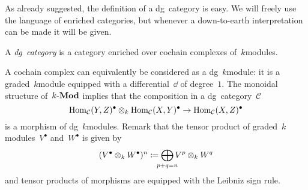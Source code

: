 As already suggested, the definition of a dg~category is easy. We will freely use the language of enriched categories, but whenever a down-to-earth interpretation can be made it will be given.
\begin{definition}
  \label{definition:dg-category-enriched}
  A \emph{dg~category} is a category enriched over cochain complexes of~$k$\dash modules.
\end{definition}
A cochain complex can equivalently be considered as a dg~$k$\dash module: it is a graded~$k$\dash module equipped with a differential~$\dd$ of degree~$1$. The monoidal structure of~$k\textrm{-}\mathbf{Mod}$ implies that the composition in a dg~category~$\mathcal{C}$
\begin{equation}
  \mathrm{Hom}_{\mathcal{C}}(Y,Z)^\bullet\otimes_k\mathrm{Hom}_{\mathcal{C}}(X,Y)^\bullet\to\mathrm{Hom}_{\mathcal{C}}(X,Z)^\bullet
\end{equation}
is a morphism of dg~$k$\dash modules. Remark that the tensor product of graded~$k$\dash modules~$V^\bullet$ and~$W^\bullet$ is given by
\begin{equation}
  (V^\bullet\otimes_k W^\bullet)^n\coloneqq\bigoplus_{\mathclap{p+q=n}}V^p\otimes_k W^q
\end{equation}
and tensor products of morphisms are equipped with the Leibniz sign rule.

